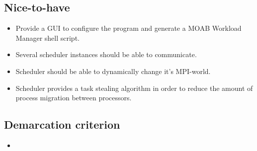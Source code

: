 	\subsection{Nice-to-have}
		\begin{itemize}
			\item Provide a GUI to configure the program and generate a MOAB Workload Manager shell script.
			\item Several scheduler instances should be able to communicate.
			\item Scheduler should be able to dynamically change it's MPI-world.
			\item Scheduler provides a task stealing algorithm in order to reduce the amount of process migration between processors.
		\end{itemize}
	\subsection{Demarcation criterion}
		\begin{itemize}
			\item
		\end{itemize}